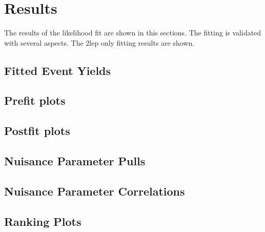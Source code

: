 \chapter{Results}

The results of the likelihood fit are shown in this sections. The fitting is validated with several aspects.
The 2lep only fitting results are shown.

\section{Fitted Event Yields}
\section{Prefit plots}

\section{Postfit plots}
\section{Nuisance Parameter Pulls}
\section{Nuisance Parameter Correlations}
\section{Ranking Plots}

